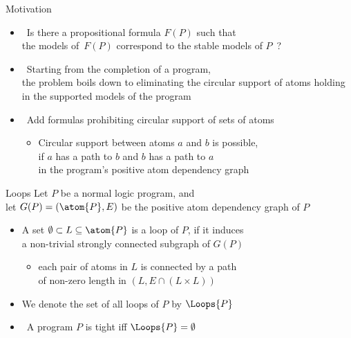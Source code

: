 \begin{frame}[c]{Motivation}
  \begin{itemize}
  \item<1->  \
    Is there a propositional formula $F(P)$ such that\\ the models of~$F(P)$ correspond to the
    stable models of $P$~?
    \bigskip
  \item<2->  \
    Starting from the completion of a program,\\
    the problem boils down to eliminating the circular support of atoms
    holding in the supported models of the program
    \medskip
  \item<3->  \
    Add formulas prohibiting circular support of sets of atoms
    \medskip
    \begin{itemize}\normalsize
    \item<4->[\itarrow]
      Circular support between atoms $a$ and $b$ is possible,\\
      if $a$ has a path to $b$ and $b$ has a path to $a$\\
      in the program's positive atom dependency graph
    \end{itemize}
  \end{itemize}
\end{frame}
\begin{frame}{Loops}
  \bigskip
  Let $P$ be a normal logic program, and\\
  let $G(P) = (\atom{P},E)$ be the positive atom dependency graph of $P$
  \par
  \smallskip
  \begin{itemize}
  \item<2-> A set $\emptyset\subset L \subseteq \atom{P}$ is a \alert{loop} of $P$,
    if it induces\\ a non-trivial strongly connected subgraph of $G(P)$
    \begin{itemize}\normalsize
    \item<3->[\itarrow] each pair of atoms in $L$ is connected by a path\\
      of non-zero length in $(L,E\cap(L \times L))$
    \end{itemize}
    \medskip
  \item<4-> We denote the set of all loops of $P$ by $\Loops{P}$
    \medskip
  \item<5->  \ A program $P$ is tight iff $\Loops{P}=\emptyset$
  \end{itemize}
\end{frame}
